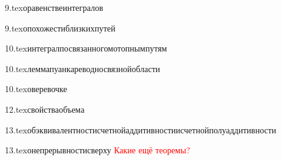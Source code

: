 {9.tex}{оравенствеинтегралов}

{9.tex}{опохожестиблизкихпутей}

{10.tex}{интегралпосвязанногомотопнымпутям}

{10.tex}{леммапуанкареводносвязнойобласти}

{10.tex}{оверевочке}

{12.tex}{свойстваобъема}

{13.tex}{обэквивалентностисчетнойаддитивностиисчетнойполуаддитивности}

{13.tex}{онепрерывностисверху}
\textcolor{red}{Какие ещё теоремы?}

